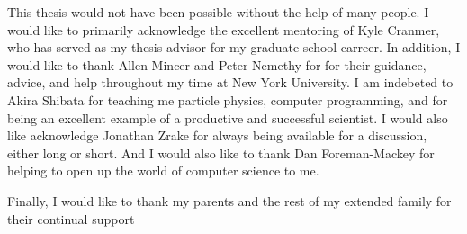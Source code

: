 %

This thesis would not have been possible without the help of many people.
I would like to primarily acknowledge the excellent mentoring of Kyle Cranmer, who has served as my thesis advisor for my graduate school carreer.
In addition, I would like to thank Allen Mincer and Peter Nemethy for for their guidance, advice, and help throughout my time at New York University.
I am indebeted to Akira Shibata for teaching me particle physics, computer programming, and for being an excellent example of a productive and successful scientist.
I would also like acknowledge Jonathan Zrake for always being available for a discussion, either long or short.
And I would also like to thank Dan Foreman-Mackey for helping to open up the world of computer science to me.

Finally, I would like to thank my parents and the rest of my extended family for their continual support
